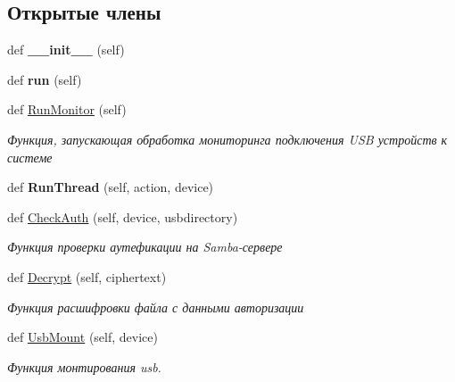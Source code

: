 \subsection*{Открытые члены}
\begin{DoxyCompactItemize}
\item 
\mbox{\label{classisofc-service_1_1DeviceHandler_af953fc36e5e72bc5ef726f7438878253}} 
def {\bfseries \+\_\+\+\_\+init\+\_\+\+\_\+} (self)
\item 
\mbox{\label{classisofc-service_1_1DeviceHandler_a76c4196af1b16fc1bdec00f97500516e}} 
def {\bfseries run} (self)
\item 
def \mbox{\hyperlink{classisofc-service_1_1DeviceHandler_a87ac1ab9b3b6658023374dd42299acec}{Run\+Monitor}} (self)
\begin{DoxyCompactList}\small\item\em Функция, запускающая обработка мониторинга подключения U\+SB устройств к системе \end{DoxyCompactList}\item 
\mbox{\label{classisofc-service_1_1DeviceHandler_ac095965e3237db7b074f7b84a552e0b9}} 
def {\bfseries Run\+Thread} (self, action, device)
\item 
def \mbox{\hyperlink{classisofc-service_1_1DeviceHandler_ac3913ebd2f7446cdaa3242cc10215bb0}{Check\+Auth}} (self, device, usbdirectory)
\begin{DoxyCompactList}\small\item\em Функция проверки аутефикации на Samba-\/сервере \end{DoxyCompactList}\item 
def \mbox{\hyperlink{classisofc-service_1_1DeviceHandler_a3a5203ad41382b069d77e6fa783253fc}{Decrypt}} (self, ciphertext)
\begin{DoxyCompactList}\small\item\em Функция расшифровки файла с данными авторизации \end{DoxyCompactList}\item 
def \mbox{\hyperlink{classisofc-service_1_1DeviceHandler_a1fac2973c2340523f8640b56974574cb}{Usb\+Mount}} (self, device)
\begin{DoxyCompactList}\small\item\em Функция монтирования usb. \end{DoxyCompactList}\item 

\end{DoxyCompactItemize}
